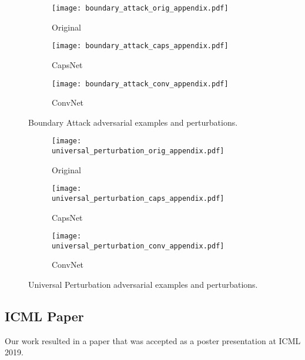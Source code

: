 \begin{figure}
	\centering
	
	\begin{subfigure}{.23\textwidth}
		\centering
		\texttt{[image: boundary\_attack\_orig\_appendix.pdf]}%
		\caption{Original}%
	\end{subfigure}%
	\begin{subfigure}{.36\textwidth}
		\centering
		\texttt{[image: boundary\_attack\_caps\_appendix.pdf]}%
		\caption{CapsNet}
	\end{subfigure}%
	\begin{subfigure}{.36\textwidth}
		\centering
		\texttt{[image: boundary\_attack\_conv\_appendix.pdf]}%
		\caption{ConvNet}
	\end{subfigure}
	\caption[Boundary Attack Adversarial Examples]{Boundary Attack adversarial examples and perturbations.}
	\label{fig:boundary-img}
	
\end{figure}

\begin{figure}
	\centering
	
	\begin{subfigure}{.23\textwidth}
		\centering
		\texttt{[image: universal\_perturbation\_orig\_appendix.pdf]}%
		\caption{Original}%
	\end{subfigure}%
	\begin{subfigure}{.36\textwidth}
		\centering
		\texttt{[image: universal\_perturbation\_caps\_appendix.pdf]}%
		\caption{CapsNet}
	\end{subfigure}%
	\begin{subfigure}{.36\textwidth}
		\centering
		\texttt{[image: universal\_perturbation\_conv\_appendix.pdf]}%
		\caption{ConvNet}
	\end{subfigure}
	\caption[Universal Adversarial Perturbation Adversarial Examples]{Universal Perturbation adversarial examples and perturbations.}
	\label{fig:universal-img}
	
\end{figure}

\subsection{ICML Paper}

Our work resulted in a paper \citep*{mine} that was accepted as a poster presentation at ICML 2019.

